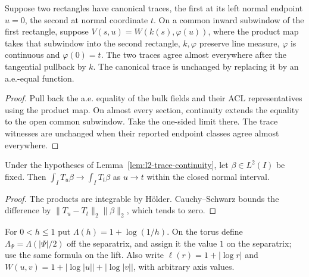 \begin{lemma}
\label{lem:one-sided-trace-comparison}
\leanok
Suppose two rectangles have canonical traces, the first at its left
normal endpoint $u=0$, the second at normal coordinate $t$.
On a common inward subwindow of the first rectangle, suppose
$V(s,u)=W(k(s),\varphi(u))$, where the product map takes that subwindow
into the second rectangle, $k,\varphi$ preserve line measure,
$\varphi$ is continuous and $\varphi(0)=t$.
The two traces agree almost everywhere after the tangential pullback by $k$.
The canonical trace is unchanged by replacing it by an a.e.-equal function.
\end{lemma}
\begin{proof}
\leanok
Pull back the a.e. equality of the bulk fields and their ACL
representatives using the product map. On almost every section,
continuity extends the equality to the open common subwindow.
Take the one-sided limit there. The trace witnesses are unchanged
when their reported endpoint classes agree almost everywhere.
\end{proof}

\begin{lemma}
\label{lem:trace-pairing-convergence}
\leanok
Under the hypotheses of Lemma~\ref{lem:l2-trace-continuity}, let
$\beta\in L^2(I)$ be fixed. Then $\int_I T_u\beta\to\int_I T_t\beta$
as $u\to t$ within the closed normal interval.
\end{lemma}
\begin{proof}
\leanok
The products are integrable by H\"older. Cauchy--Schwarz bounds the
difference by $\|T_u-T_t\|_2\|\beta\|_2$, which tends to zero.
\end{proof}

\begin{definition}
\label{def:log-level-weight}
\leanok
For $0<h\le1$ put $\Lambda(h)=1+\log(1/h)$. On the torus define
$\Lambda_\Psi=\Lambda(|\Psi|/2)$ off the separatrix, and assign it the
value $1$ on the separatrix; use the same formula on the lift.
Also write $\ell(r)=1+|\log r|$ and
$W(u,v)=1+|\log|u||+|\log|v||$, with arbitrary axis values.
\end{definition}

